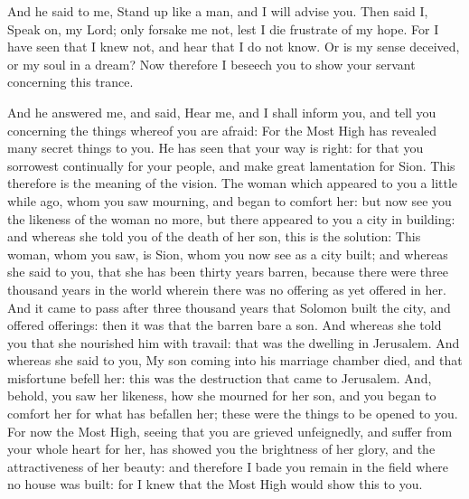 {And he said to me, Stand up like a man, and I will advise you.
Then said I, Speak on, my Lord; only forsake me not, lest I die frustrate of my hope.
For I have seen that I knew not, and hear that I do not know.
Or is my sense deceived, or my soul in a dream?
Now therefore I beseech you to show your servant concerning this trance.
\par }{\PP {}And he answered me, and said, Hear me, and I shall inform you, and tell you concerning the things whereof you are afraid: For the Most High has revealed many secret things to you.
He has seen that your way is right: for that you sorrowest continually for your people, and make great lamentation for Sion.
This therefore is the meaning of the vision.
The woman which appeared to you a little while ago, whom you saw mourning, and began to comfort her:
but now see you the likeness of the woman no more, but there appeared to you a city in building:
and whereas she told you of the death of her son, this is the solution:
This woman, whom you saw, is
 Sion,
 whom you now see as a city built;
and whereas she said to you, that she has been thirty years barren,
{} because there were three
 thousand years in the world wherein there was no offering as yet offered in her.
And it came to pass after three
 thousand years that Solomon built the city, and offered offerings: then it was that the barren bare a son.
And whereas she told you that she nourished him with travail: that was the dwelling in Jerusalem.
And whereas she said to you, My son coming into his marriage chamber died, and that misfortune befell her: this was the destruction that came to Jerusalem.
And, behold, you saw her likeness, how she mourned for her son, and you began to comfort her for what has befallen her;
 these were the things to be opened to you.
For now the Most High, seeing that you are grieved unfeignedly, and suffer from your whole heart for her, has showed you the brightness of her glory, and the attractiveness of her beauty:
and therefore I bade you remain in the field where no house was built:
for I knew that the Most High would show this to you.
}
